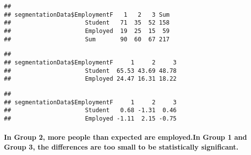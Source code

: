 \documentclass[
]{article}
\newenvironment{Shaded}{\begin{snugshade}}{\end{snugshade}}
\newcommand{\DecValTok}[1]{\textcolor[rgb]{0.00,0.00,0.81}{#1}}
\newcommand{\FunctionTok}[1]{\textcolor[rgb]{0.00,0.00,0.00}{#1}}
\newcommand{\NormalTok}[1]{#1}
\newcommand{\SpecialCharTok}[1]{\textcolor[rgb]{0.00,0.00,0.00}{#1}}
\begin{document}
\begin{Shaded}
\end{Shaded}

\begin{verbatim}
##                             
## segmentationData$EmploymentF   1   2   3 Sum
##                     Student   71  35  52 158
##                     Employed  19  25  15  59
##                     Sum       90  60  67 217
\end{verbatim}

\begin{Shaded}
\end{Shaded}

\begin{verbatim}
##                             
## segmentationData$EmploymentF     1     2     3
##                     Student  65.53 43.69 48.78
##                     Employed 24.47 16.31 18.22
\end{verbatim}

\begin{Shaded}
\end{Shaded}

\begin{verbatim}
##                             
## segmentationData$EmploymentF     1     2     3
##                     Student   0.68 -1.31  0.46
##                     Employed -1.11  2.15 -0.75
\end{verbatim}

\hypertarget{in-group-2-more-people-than-expected-are-employed.in-group-1-and-group-3-the-differences-are-too-small-to-be-statistically-significant.}{%
\paragraph{In Group 2, more people than expected are employed.In Group 1
and Group 3, the differences are too small to be statistically
significant.}\label{in-group-2-more-people-than-expected-are-employed.in-group-1-and-group-3-the-differences-are-too-small-to-be-statistically-significant.}}
\end{document}
